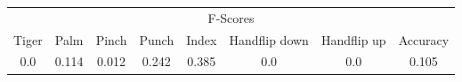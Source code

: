 \documentclass{standalone}
\begin{document}
 
 \begin{tabular}{|c|c|c|c|c|c|c ||c|}
\cline{1-8}\multicolumn{8}{|c|}{F-Scores} \\ 
\cline{1-8}Tiger & Palm & Pinch & Punch & Index & Handflip down & Handflip up & Accuracy\\ 
\cline{1-8}0.0 & 0.114 & 0.012 & 0.242 & 0.385 & 0.0 & 0.0 & 0.105\\ 
 \cline{1-8}\hline \end{tabular}
 
\end{document}
